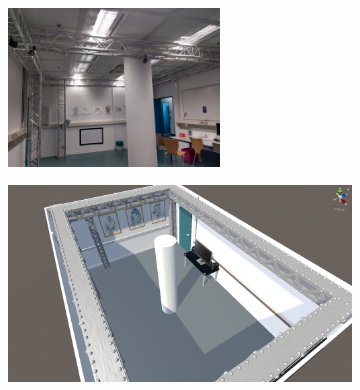 \begin{figure}[b!]
    \begin{subfigure}{0.5\textwidth}
        \centering
        \includegraphics[width=\textwidth, height=4.2cm]{figures/photo_lab}
        \label{sfig:lab_photo}
    \end{subfigure}%
    \begin{subfigure}{0.5\textwidth}
        \includegraphics[width=\textwidth]{figures/lab3}
        \label{sfig:lab_screenshot_1}
    \end{subfigure}%
    
    \vspace{-1.25em}
    

\end{figure}

